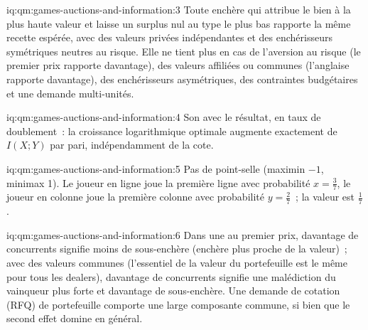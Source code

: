 \begin{solution}{iq:qm:games-auctions-and-information:3}
Toute enchère qui attribue le bien à la plus haute valeur et laisse un surplus nul au type le plus bas rapporte la même recette espérée, avec des valeurs privées indépendantes et des enchérisseurs symétriques neutres au risque. Elle ne tient plus en cas de
l'aversion au risque (le premier prix rapporte davantage), des valeurs affiliées ou communes (l'anglaise rapporte davantage), des enchérisseurs asymétriques, des contraintes budgétaires et une demande multi-unités.
\end{solution}

\begin{solution}{iq:qm:games-auctions-and-information:4}
Son  avec le résultat, en taux de doublement~: la croissance logarithmique optimale augmente exactement de $I(X; Y)$ par pari, indépendamment de la cote.
\end{solution}

\begin{solution}{iq:qm:games-auctions-and-information:5}
Pas de point-selle (maximin $-1$, minimax 1). Le joueur en ligne joue la première ligne avec probabilité $x = \frac37$, le joueur en colonne joue la première colonne avec probabilité $y = \frac27$~; la valeur est $\frac17$.
\end{solution}

\begin{solution}{iq:qm:games-auctions-and-information:6}
Dans une  au premier prix, davantage de concurrents signifie moins de sous-enchère (enchère plus proche de la valeur)~; avec des valeurs communes (l'essentiel de la valeur du portefeuille est le même pour tous les dealers), davantage de concurrents signifie une malédiction du
vainqueur plus forte et davantage de sous-enchère. Une demande de cotation (RFQ) de portefeuille comporte une large composante commune, si bien que le second effet domine en général.
\end{solution}
